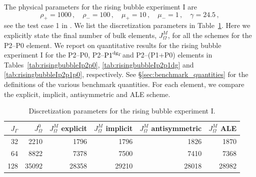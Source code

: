 \documentclass[a4paper,12pt,onecolumn]{article}
\newcommand{\pdg}{${\rm P1}^{{\rm dg}_\Gamma}$} %
\begin{document}
The physical parameters for the rising bubble experiment I are
\begin{equation} \label{eq:Hysing1}
\rho_+ = 1000\,,\quad \rho_- = 100\,,\quad \mu_+ = 10\,,\quad \mu_- = 1\,,\quad
\gamma = 24.5\,,
\end{equation}
see the test case 1 in \cite[Table~I]{HysingTKPBGT09}. We list the
discretization parameters in Table~\ref{tab:risingbubble2Delements}. Here we
explicitly state the final number of bulk elements, $J_\Omega^M$, for all the
schemes for the P2--P0 element. We report on quantitative results for the
rising bubble experiment I for the P2--P0, P2--\pdg and P2--(P1+P0) elements in
Tables~\ref{tab:risingbubbleIp2p0}, \ref{tab:risingbubbleIp2p1dg} and
\ref{tab:risingbubbleIp2p1p0}, respectively. See
\S\ref{sec:benchmark_quantities} for the definitions of the various benchmark
quantities. For each element, we compare the explicit, implicit, antisymmetric
and ALE scheme.
\begin{table}
\center
\begin{tabular}{rrrrrr}
\hline
$J_\Gamma$ & $J_\Omega^0$ & $J_\Omega^M$ explicit & $J_\Omega^M$ implicit &
$J_\Omega^M$ antisymmetric & $J_\Omega^M$ ALE \\
\hline
 32 &  2210 &  1796 &  1796 &  1826 &  1870 \\
 64 &  8822 &  7378 &  7500 &  7410 &  7368 \\
128 & 35092 & 28358 & 29210 & 28018 & 28982 \\
\hline
\end{tabular}
\caption[Navier--Stokes rising bubble I meshes parameters]
{Discretization parameters for the rising bubble experiment I.}
\label{tab:risingbubble2Delements}
\end{table}
\end{document}
